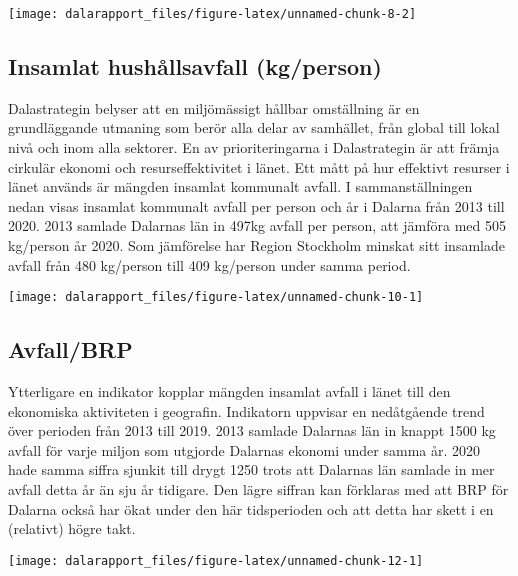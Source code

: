 \documentclass[
]{article}
\begin{document}
\begin{center}\texttt{[image: dalarapport\_files/figure-latex/unnamed-chunk-8-2]} \end{center}

\hypertarget{insamlat-hushuxe5llsavfall-kgperson}{%
\subsection{Insamlat hushållsavfall
(kg/person)}\label{insamlat-hushuxe5llsavfall-kgperson}}

Dalastrategin belyser att en miljömässigt hållbar omställning är en
grundläggande utmaning som berör alla delar av samhället, från global
till lokal nivå och inom alla sektorer. En av prioriteringarna i
Dalastrategin är att främja cirkulär ekonomi och resurseffektivitet i
länet. Ett mått på hur effektivt resurser i länet används är mängden
insamlat kommunalt avfall. I sammanställningen nedan visas insamlat
kommunalt avfall per person och år i Dalarna från 2013 till 2020. 2013
samlade Dalarnas län in 497kg avfall per person, att jämföra med 505
kg/person år 2020. Som jämförelse har Region Stockholm minskat sitt
insamlade avfall från 480 kg/person till 409 kg/person under samma
period.

\begin{center}\texttt{[image: dalarapport\_files/figure-latex/unnamed-chunk-10-1]} \end{center}

\hypertarget{avfallbrp}{%
\subsection{Avfall/BRP}\label{avfallbrp}}

Ytterligare en indikator kopplar mängden insamlat avfall i länet till
den ekonomiska aktiviteten i geografin. Indikatorn uppvisar en
nedåtgående trend över perioden från 2013 till 2019. 2013 samlade
Dalarnas län in knappt 1500 kg avfall för varje miljon som utgjorde
Dalarnas ekonomi under samma år. 2020 hade samma siffra sjunkit till
drygt 1250 trots att Dalarnas län samlade in mer avfall detta år än sju
år tidigare. Den lägre siffran kan förklaras med att BRP för Dalarna
också har ökat under den här tidsperioden och att detta har skett i en
(relativt) högre takt.

\begin{center}\texttt{[image: dalarapport\_files/figure-latex/unnamed-chunk-12-1]} \end{center}
\end{document}
